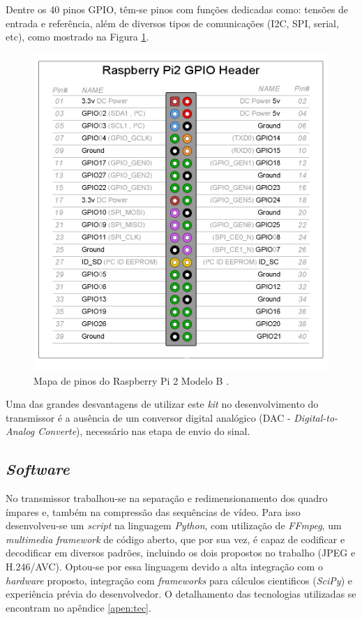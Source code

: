 Dentre os 40 pinos GPIO, têm-se pinos com funções dedicadas como: tensões de entrada e referência, além de diversos tipos de comunicações (I2C, SPI, serial, etc), como mostrado na Figura \ref{fig:rasp_gpio}.

\begin{figure}[h]
	\centering
	\includegraphics[scale=.3]{figuras/GPIO_Pi2.png}
	\caption{ Mapa de pinos do Raspberry Pi 2 Modelo B \cite{element14}.}
	\label{fig:rasp_gpio}
\end{figure}

Uma das grandes desvantagens de utilizar este \textit{kit} no desenvolvimento do transmissor é a ausência de um conversor digital analógico (DAC -\textit{ Digital-to-Analog Converte}), necessário nas etapa de envio do sinal.

\subsection{\textit{Software}}

No transmissor trabalhou-se na separação e redimensionamento dos quadro ímpares e, também na compressão das sequências de vídeo. Para isso desenvolveu-se um \textit{script } na linguagem \textit{Python}, com utilização de \textit{FFmpeg}, um \textit{multimedia framework} de código aberto, que por sua vez, é  capaz de codificar e decodificar em diversos padrões, incluindo os dois propostos no trabalho (JPEG e H.246/AVC). Optou-se por essa linguagem devido a alta integração com o \textit{hardware} proposto, integração com \textit{frameworks} para cálculos cientificos (\textit{SciPy}) e experiência prévia do desenvolvedor. O detalhamento das tecnologias utilizadas se encontram no apêndice \ref{apen:tec}.

